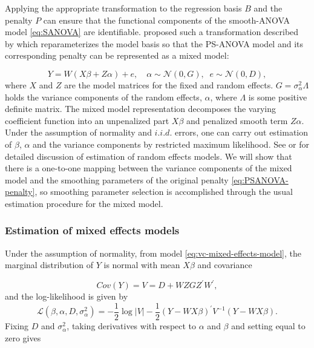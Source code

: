 \documentclass[12pt]{article}
\theoremstyle{definition}
\begin{document}
Applying the appropriate transformation to the regression basis $B$ and the penalty $P$ can ensure that the functional components of the smooth-ANOVA model \ref{eq:SANOVA} are identifiable. \citet{lee2011p} proposed such a transformation described by \citet{currie2002flexible} which reparameterizes the model basis so that the PS-ANOVA model and its corresponding penalty can be represented as a mixed model:

\begin{equation}  \label{eq:vc-mixed-effects-model}
Y = W\left(X \beta + Z \alpha\right) + e, \quad \alpha \sim \mathcal{N}\left(0,G \right),\;\; e\sim\mathcal{N}\left(0, D \right),
\end{equation} 
\noindent
where $X$ and $Z$ are the model matrices for the fixed and random effects. $G = \sigma_\alpha^2 \Lambda$ holds the variance components of the random effects, $\alpha$, where $\Lambda$ is some positive definite matrix. The mixed model representation decomposes the varying coefficient function into an unpenalized part $X \beta$ and penalized smooth term $Z \alpha.$ Under the assumption of normality and $i.i.d.$ errors, one can carry out estimation of $\beta$, $\alpha$ and the variance components by restricted maximum likelihood. See \citet{schall1991estimation} or  \citet{patterson1971recovery} for detailed discussion of estimation of random effects models.  We will show that there is a one-to-one mapping between the variance components of the mixed model and the smoothing parameters of the original penalty \ref{eq:PSANOVA-penalty}, so smoothing parameter selection is accomplished through the usual estimation procedure for the mixed model.

\subsubsection{Estimation of mixed effects models}

Under the assumption of normality, from model \ref{eq:vc-mixed-effects-model}, the marginal distribution of $Y$ is normal with mean $X\beta$ and covariance 

\begin{equation} \label{eq:mm-marginal-covariance}
Cov\left(Y\right) = V = D + WZ G Z^\prime W^\prime,
\end{equation}
\noindent
and the log-likelihood is given by
\begin{equation} \label{eq:mm-log-likelihood}
\mathcal{L} \left( \beta, \alpha, D , \sigma_\alpha^2 \right) = -\frac{1}{2} \log\vert V \vert - \frac{1}{2} \left( Y - WX\beta \right)^\prime V^{-1}\left( Y - WX\beta \right). 
\end{equation}
\noindent
Fixing $D$ and $\sigma_\alpha^2$, taking derivatives with respect to $\alpha$ and $\beta$ and setting equal to zero gives
\end{document}
